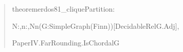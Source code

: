 \documentclass[spanish,11pt,a4paper]{article}
\newlength{\LeanCharWidth}
\begin{document}
\begin{quote}\fontsize{8.5}{10.2}\selectfont\ttfamily\raggedright\setlength{\parskip}{0pt}\settowidth{\LeanCharWidth}{0}
\noindent theorem\hspace*{\dimexpr 1\LeanCharWidth\relax}erdos81\_cliquePartition\hspace*{\dimexpr 1\LeanCharWidth\relax}:\par
\noindent \hspace*{\dimexpr 4\LeanCharWidth\relax}{\LeanSymbols ∃}\hspace*{\dimexpr 1\LeanCharWidth\relax}N\hspace*{\dimexpr 1\LeanCharWidth\relax}:\hspace*{\dimexpr 1\LeanCharWidth\relax}{\LeanSymbols ℕ},\hspace*{\dimexpr 1\LeanCharWidth\relax}{\LeanSymbols ∀}\hspace*{\dimexpr 1\LeanCharWidth\relax}n\hspace*{\dimexpr 1\LeanCharWidth\relax}:\hspace*{\dimexpr 1\LeanCharWidth\relax}{\LeanSymbols ℕ},\hspace*{\dimexpr 1\LeanCharWidth\relax}N\hspace*{\dimexpr 1\LeanCharWidth\relax}{\LeanSymbols ≤}\hspace*{\dimexpr 1\LeanCharWidth\relax}n\hspace*{\dimexpr 1\LeanCharWidth\relax}{\LeanSymbols →}\hspace*{\dimexpr 1\LeanCharWidth\relax}{\LeanSymbols ∀}\hspace*{\dimexpr 1\LeanCharWidth\relax}(G\hspace*{\dimexpr 1\LeanCharWidth\relax}:\hspace*{\dimexpr 1\LeanCharWidth\relax}SimpleGraph\hspace*{\dimexpr 1\LeanCharWidth\relax}(Fin\hspace*{\dimexpr 1\LeanCharWidth\relax}n))\hspace*{\dimexpr 1\LeanCharWidth\relax}[DecidableRel\hspace*{\dimexpr 1\LeanCharWidth\relax}G.Adj],\par
\noindent \hspace*{\dimexpr 6\LeanCharWidth\relax}PaperIV.FarRounding.IsChordal\hspace*{\dimexpr 1\LeanCharWidth\relax}G\hspace*{\dimexpr 1\LeanCharWidth\relax}{\LeanSymbols →}\par

\end{quote}
\end{document}
